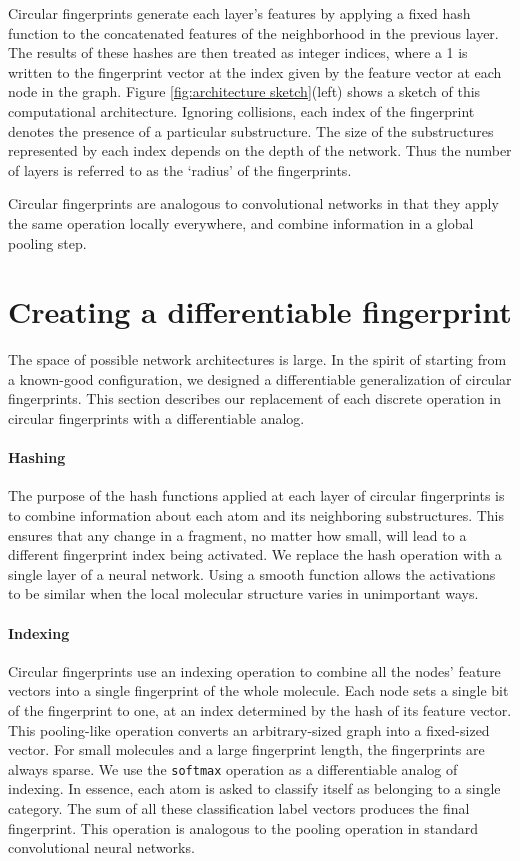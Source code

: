 \documentclass{article}
\begin{document}
Circular fingerprints generate each layer's features by applying a fixed hash function to the concatenated features of the neighborhood in the previous layer.
The results of these hashes are then treated as integer indices, where a 1 is written to the fingerprint vector at the index given by the feature vector at each node in the graph.
Figure \ref{fig:architecture sketch}(left) shows a sketch of this computational architecture.
Ignoring collisions, each index of the fingerprint denotes the presence of a particular substructure.
The size of the substructures represented by each index depends on the depth of the network.
Thus the number of layers is referred to as the `radius' of the fingerprints.



Circular fingerprints are analogous to convolutional networks in that they apply the same operation locally everywhere,  and combine information in a global pooling step.


\section{Creating a differentiable fingerprint}
\vspace{-3mm}
The space of possible network architectures is large.
In the spirit of starting from a known-good configuration, we designed a differentiable generalization of circular fingerprints.
This section describes our replacement of each discrete operation in circular fingerprints with a differentiable analog.

\paragraph{Hashing}
The purpose of the hash functions applied at each layer of circular fingerprints is to combine information about each atom and its neighboring substructures.
This ensures that any change in a fragment, no matter how small, will lead to a different fingerprint index being activated.
We replace the hash operation with a single layer of a neural network.
Using a smooth function allows the activations to be similar when the local molecular structure varies in unimportant ways.

\paragraph{Indexing}
Circular fingerprints use an indexing operation to combine all the nodes' feature vectors into a single fingerprint of the whole molecule.
Each node sets a single bit of the fingerprint to one, at an index determined by the hash of its feature vector.
This pooling-like operation converts an arbitrary-sized graph into a fixed-sized vector.
For small molecules and a large fingerprint length, the fingerprints are always sparse.
We use the \texttt{softmax} operation as a differentiable analog of indexing.
In essence, each atom is asked to classify itself as belonging to a single category.
The sum of all these classification label vectors produces the final fingerprint.
This operation is analogous to the pooling operation in standard convolutional neural networks.
\end{document}
